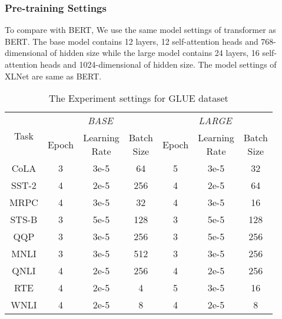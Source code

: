 \documentclass[letterpaper]{article} \usepackage{aaai20}  \usepackage{times}  \usepackage{helvet} \usepackage{courier}  \usepackage[hyphens]{url}  \usepackage{graphicx} \usepackage{makecell}
\begin{document}
\subsubsection{Pre-training Settings}
To compare with BERT\cite{devlin2018bert}, We use the same model settings of transformer as BERT. 
The base model contains 12 layers, 12 self-attention heads and 768-dimensional of hidden size while the large model contains 24 layers, 16 self-attention heads and 1024-dimensional of hidden size. The model settings of XLNet \cite{yang2019xlnet} are same as BERT. 
\begin{table}[htbp]
\small
\begin{center}
\resizebox{0.45\textwidth}{!}
{
\begin{tabular}{@{}c|ccc|ccc@{}}
  \hline \hline 
   \multirow{2}{*}{Task}      &  \multicolumn{3}{c|}{\textit{BASE}} & \multicolumn{3}{c}{\textit{LARGE}} \\ \cline{2-7}
                &  Epoch & \makecell{Learning \\ Rate}  & \makecell{Batch \\ Size} &  Epoch & \makecell{Learning \\ Rate} & \makecell{Batch \\ Size} \\ \hline 
  CoLA  & 3 & 3e-5 & 64  & 5 & 3e-5 & 32 \\
  SST-2  & 4 & 2e-5 & 256 & 4 & 2e-5 & 64  \\
  MRPC  & 4 & 3e-5 & 32 & 4 & 3e-5 & 16 \\
  STS-B  & 3 & 5e-5 & 128 & 3 & 5e-5 & 128 \\
  QQP  & 3 & 3e-5 & 256  & 3 & 5e-5 & 256  \\
  MNLI  & 3 & 3e-5 & 512 & 3 & 3e-5 & 256 \\
  QNLI  & 4 & 2e-5 & 256 & 4 & 2e-5 & 256  \\
  RTE  & 4 & 2e-5 & 4 & 5 & 3e-5 & 16  \\
  WNLI  & 4 & 2e-5 & 8 & 4 & 2e-5 & 8   \\
\hline \hline
\end{tabular}
} \end{center}
\caption{The Experiment settings for GLUE dataset}
\label{GLUE_finetune_setting}
\end{table}
\end{document}
